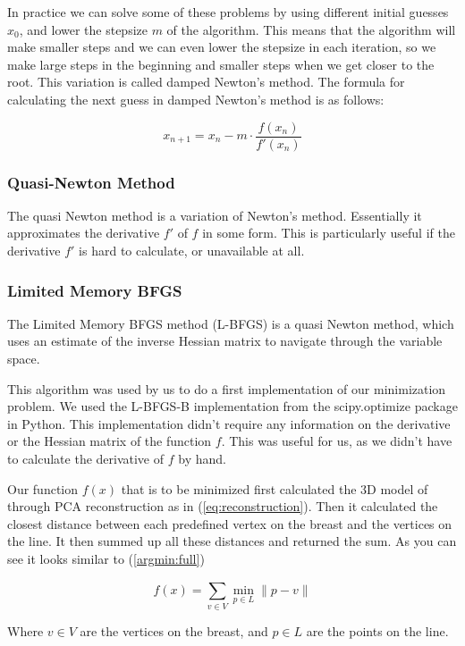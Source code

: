 In practice we can solve some of these problems by using different initial guesses $x_0$, and lower the stepsize $m$ of the algorithm. This means that the algorithm will make smaller steps and we can even lower the stepsize 
in each iteration, so we make large steps in the beginning and smaller steps when we get closer to the root. This variation is called damped Newton's method. The formula for calculating the next guess in damped Newton's method is as follows:

\[
    x_{n+1} = x_n - m \cdot \frac{f(x_n)}{f'(x_n)}
\]

\subsubsection{Quasi-Newton Method}

The quasi Newton method is a variation of Newton's method. Essentially it approximates the derivative $f'$ of $f$ in some form. This is particularly useful if the derivative $f'$ is hard to calculate, or unavailable at all.

\subsubsection{Limited Memory BFGS}

The Limited Memory BFGS method (L-BFGS) is a quasi Newton method, which uses an estimate of the inverse Hessian matrix to navigate through the variable space. 

This algorithm was used by us to do a first implementation of our minimization problem. We used the L-BFGS-B implementation from the scipy.optimize package in Python. This implementation didn't require any information on the derivative
or the Hessian matrix of the function $f$. This was useful for us, as we didn't have to calculate the derivative of $f$ by hand. 

Our function $f(x)$ that is to be minimized first calculated the 3D model of through PCA reconstruction as in (\ref{eq:reconstruction}). Then it calculated the closest distance between each predefined vertex on the breast and the 
vertices on the line. It then summed up all these distances and returned the sum. As you can see it looks similar to (\ref{argmin:full})

\[
    f(x) = \sum_{v \in V}^{} \min_{p \in L} \lVert p - v \rVert
\]

Where $v \in V$ are the vertices on the breast, and $p \in L$ are the points on the line.

